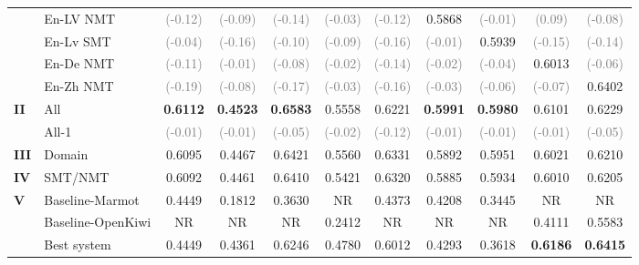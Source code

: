 \begin{table}[t]
\begin{center}
{\begin{tabular}{l l c c c c c c c c c}
				& En-LV NMT & \textcolor{gray}{(-0.12)} & \textcolor{gray}{(-0.09)} & \textcolor{gray}{(-0.14)} & \textcolor{gray}{(-0.03)} & \textcolor{gray}{(-0.12)} & 0.5868 & \textcolor{gray}{(-0.01)} & \textcolor{gray}{(0.09)} & \textcolor{gray}{(-0.08)} \\
				& En-Lv SMT & \textcolor{gray}{(-0.04)} & \textcolor{gray}{(-0.16)} & \textcolor{gray}{(-0.10)} & \textcolor{gray}{(-0.09)} & \textcolor{gray}{(-0.16)} & \textcolor{gray}{(-0.01)}  & 0.5939 & \textcolor{gray}{(-0.15)} & \textcolor{gray}{(-0.14)} \\
				& En-De NMT & \textcolor{gray}{(-0.11)} & \textcolor{gray}{(-0.01)} & \textcolor{gray}{(-0.08)} & \textcolor{gray}{(-0.02)} & \textcolor{gray}{(-0.14)} & \textcolor{gray}{(-0.02)}  & \textcolor{gray}{(-0.04)} & 0.6013 &  \textcolor{gray}{(-0.06)} \\
				& En-Zh NMT & \textcolor{gray}{(-0.19)} & \textcolor{gray}{(-0.08)} & \textcolor{gray}{(-0.17)} & \textcolor{gray}{(-0.03)} & \textcolor{gray}{(-0.16)} & \textcolor{gray}{(-0.03)}  & \textcolor{gray}{(-0.06)} & \textcolor{gray}{(-0.07)} & 0.6402 \\
				\midrule
				\multirow{2}{*}{\bf II} & All & \textbf{0.6112} & \textbf{0.4523} & \textbf{0.6583} & 0.5558 & 0.6221 & \textbf{0.5991} & \textbf{0.5980} & 0.6101 & 0.6229\\
				& All-1 & \textcolor{gray}{(-0.01)} & \textcolor{gray}{(-0.01)} & \textcolor{gray}{(-0.05)} & \textcolor{gray}{(-0.02)} & \textcolor{gray}{(-0.12)} & \textcolor{gray}{(-0.01)} & \textcolor{gray}{(-0.01)} & \textcolor{gray}{(-0.01)} & \textcolor{gray}{(-0.05)} \\
				\midrule
				\multirow{1}{*}{\bf III} & Domain & 0.6095 &  0.4467 & 0.6421 & 0.5560 & 0.6331 & 0.5892 & 0.5951  & 0.6021 &  0.6210 \\
				\midrule
				\multirow{1}{*}{\bf IV} & SMT/NMT & 0.6092 & 0.4461  & 0.6410 & 0.5421 & 0.6320 & 0.5885 & 0.5934 & 0.6010 & 0.6205 \\
				\midrule
				\multirow{3}{*}{\bf V} & Baseline-Marmot & 0.4449 & 0.1812 & 0.3630 & NR & 0.4373 & 0.4208 & 0.3445 & NR & NR \\
				& Baseline-OpenKiwi & NR & NR & NR & 0.2412 & NR & NR & NR & 0.4111 & 0.5583 \\
				& Best system & 0.4449 & 0.4361 & 0.6246 & 0.4780 & 0.6012 & 0.4293 & 0.3618 & \textbf{0.6186} & \textbf{0.6415} \\
				\bottomrule
			\end{tabular}
		}
	\end{center}

\end{table}
